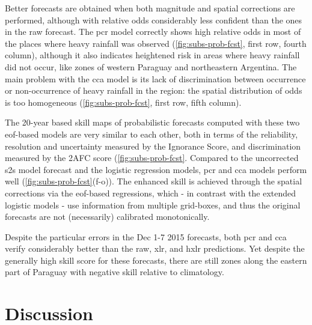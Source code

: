 \documentclass[twocol]{ametsoc}
\begin{document}
Better forecasts are obtained when both magnitude and spatial corrections are performed, although with relative odds considerably less confident than the ones in the raw forecast.
The \gls{pcr} model correctly shows high relative odds in most of the places where heavy rainfall was observed (\cref{fig:subs-prob-fcst}, first row, fourth column), although it also indicates heightened risk in areas where heavy rainfall did not occur, like zones of western Paraguay and northeastern Argentina.
The main problem with the \gls{cca} model is its lack of discrimination between occurrence or non-occurrence of heavy rainfall in the region: the spatial distribution of odds is too homogeneous (\cref{fig:subs-prob-fcst}, first row, fifth column).

The 20-year based skill maps of probabilistic forecasts computed with these two \gls{eof}-based models are very similar to each other, both in terms of the reliability, resolution and uncertainty measured by the Ignorance Score, and discrimination measured by the 2AFC score (\cref{fig:subs-prob-fcst}.
Compared to the uncorrected \gls{s2s} model forecast and the logistic regression models, \gls{pcr} and \gls{cca} models perform well (\cref{fig:subs-prob-fcst}(f-o)).
The enhanced skill is achieved through the spatial corrections via the \gls{eof}-based regressions, which - in contrast with the extended logistic models - use information from multiple grid-boxes, and thus the original forecasts are not (necessarily) calibrated monotonically.

Despite the particular errors in the Dec 1-7 2015 forecasts, both \gls{pcr} and \gls{cca} verify considerably better than the raw, \gls{xlr}, and \gls{hxlr} predictions.
Yet despite the generally high skill score for these forecasts, there are still zones along the eastern part of Paraguay with negative skill relative to climatology.


\section{Discussion}
\label{sec:discussion}
\end{document}
